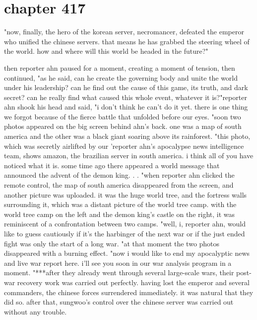 \section{chapter 417}

"now, finally, the hero of the korean server, necromancer, defeated the emperor who unified the chinese servers.
 that means he has grabbed the steering wheel of the world.
 how and where will this world be headed in the future?"




then reporter ahn paused for a moment, creating a moment of tension, then continued, "as he said, can he create the governing body and unite the world under his leadership? can he find out the cause of this game, its truth, and dark secret? can he really find what caused this whole event, whatever it is?"reporter ahn shook his head and said, "i don't think he can't do it yet.
 there is one thing we forgot because of the fierce battle that unfolded before our eyes.
"soon two photos appeared on the big screen behind ahn's back.
one was a map of south america and the other was a black giant soaring above its rainforest.
"this photo, which was secretly airlifted by our 'reporter ahn's apocalypse news intelligence team, shows amazon, the brazilian server in south america.
 i think all of you have noticed what it is.
 some time ago there appeared a world message that announced the advent of the demon king.
.
.
"when reporter ahn clicked the remote control, the map of south america disappeared from the screen, and another picture was uploaded.
it was the huge world tree, and the fortress walls surrounding it, which was a distant picture of the world tree camp.
with the world tree camp on the left and the demon king's castle on the right, it was reminiscent of a confrontation between two camps.
 "well, i, reporter ahn, would like to guess cautiously if it's the harbinger of the next war or if the just ended fight was only the start of a long war.
"at that moment the two photos disappeared with a burning effect.
"now i would like to end my apocalyptic news and live war report here.
 i'll see you soon in our war analysis program in a moment.
"***after they already went through several large-scale wars, their post-war recovery work was carried out perfectly.
 having lost the emperor and several commanders, the chinese forces surrendered immediately.
 it was natural that they did so.
 after that, sungwoo's control over the chinese server was carried out without any trouble.
 
